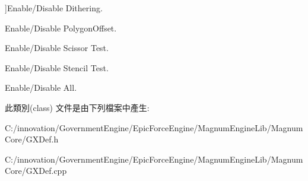 \begin{Desc}
\begin{description}
{}]Enable/\+Disable Dithering. \item[{\em 
Polygon\+Offset\+Fill\hypertarget{class_i_dream_sky_1_1_g_x_enable_mode_a71ccd6deecee0cb55fd02e61a50151eea8fe94b012480f068321f73f2f9b5fceb}{}\label{class_i_dream_sky_1_1_g_x_enable_mode_a71ccd6deecee0cb55fd02e61a50151eea8fe94b012480f068321f73f2f9b5fceb}
}]Enable/\+Disable Polygon\+Offset. \item[{\em 
Scissor\+Test\hypertarget{class_i_dream_sky_1_1_g_x_enable_mode_a71ccd6deecee0cb55fd02e61a50151eeacd4fa106fd1da6db3d45975cbae2474b}{}\label{class_i_dream_sky_1_1_g_x_enable_mode_a71ccd6deecee0cb55fd02e61a50151eeacd4fa106fd1da6db3d45975cbae2474b}
}]Enable/\+Disable Scissor Test. \item[{\em 
Stencil\+Test\hypertarget{class_i_dream_sky_1_1_g_x_enable_mode_a71ccd6deecee0cb55fd02e61a50151eeafc42d10a4e8312c05b5d0b10bba5341b}{}\label{class_i_dream_sky_1_1_g_x_enable_mode_a71ccd6deecee0cb55fd02e61a50151eeafc42d10a4e8312c05b5d0b10bba5341b}
}]Enable/\+Disable Stencil Test. \item[{\em 
All\hypertarget{class_i_dream_sky_1_1_g_x_enable_mode_a71ccd6deecee0cb55fd02e61a50151eeaa7e2bd8764a203fc7dd8dfcf7cf9bc17}{}\label{class_i_dream_sky_1_1_g_x_enable_mode_a71ccd6deecee0cb55fd02e61a50151eeaa7e2bd8764a203fc7dd8dfcf7cf9bc17}
}]Enable/\+Disable All. \end{description}
\end{Desc}


此類別(class) 文件是由下列檔案中產生\+:\begin{DoxyCompactItemize}
\item 
C\+:/innovation/\+Government\+Engine/\+Epic\+Force\+Engine/\+Magnum\+Engine\+Lib/\+Magnum\+Core/G\+X\+Def.\+h\item 
C\+:/innovation/\+Government\+Engine/\+Epic\+Force\+Engine/\+Magnum\+Engine\+Lib/\+Magnum\+Core/G\+X\+Def.\+cpp\end{DoxyCompactItemize}
